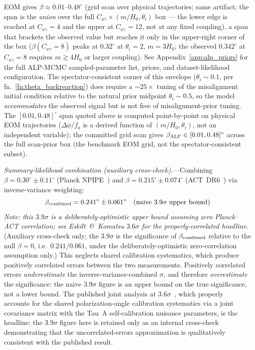 \documentclass[aps,prd,twocolumn,superscriptaddress,showpacs,preprintnumbers,nofootinbib,longbibliography,floatfix]{revtex4-2}
\newcommand{\sigmaunit}{\sigma}
\begin{document}
EOM gives $\beta\approx 0.01$--$0.48^\circ$ (grid scan over physical
trajectories; same artifact; the span is the \emph{union} over the full
$C_{a\gamma}\times(m/H_0,\theta_i)$ box --- the lower edge is reached at
$C_{a\gamma}=4$ and the upper at $C_{a\gamma}=12$, not at any fixed
coupling), a span that brackets the observed value but
reaches it only in the upper-right corner of the box ($\beta(C_{a\gamma}{=}8)$
peaks at $0.32^\circ$ at $\theta_i=2$, $m=3H_0$; the observed
$0.342^\circ$ at $C_{a\gamma}=8$ requires $m\gtrsim 4H_0$ or larger
coupling). See Appendix~\ref{app:alp_priors}
for the full ALP-MCMC sampled-parameter list, priors, and dataset-likelihood
configuration. The spectator-consistent corner of this envelope
($\theta_i\sim 0.1$, per fn.~\ref{fn:theta_backreaction}) does require a
$\sim 25\times$ tuning of the misalignment initial condition relative to the
natural prior midpoint $\theta_i\sim 0.5$, so the model
\textit{accommodates} the observed signal but is not free of misalignment-prior tuning.
The $[0.01,0.48]^\circ$ span quoted above is computed point-by-point on
physical EOM trajectories ($\Delta\phi/f_a$ is a derived function of
$(m/H_0, \theta_i)$, not an independent variable);
the committed grid scan gives $\beta_{\rm ALP}\in[0.01,0.48]^\circ$
across the full scan-prior box (the benchmark EOM grid, not the spectator-consistent subset).

\textit{Summary-likelihood combination (auxiliary cross-check).}---Combining
$\beta = 0.30^\circ\pm 0.11^\circ$ (Planck NPIPE~\cite{DiegoPalazuelos2022}) and
$\beta = 0.215^\circ\pm 0.074^\circ$ (ACT~DR6~\cite{DiegoPalazuelos2025}) via
inverse-variance weighting:
\begin{equation}
\beta_{\rm combined} = 0.241^\circ\pm 0.061^\circ \quad (\text{naive } 3.9\sigmaunit\text{ upper bound})
\label{eq:beta_combined}
\end{equation}
\emph{Note: this $3.9\sigmaunit$ is a deliberately-optimistic upper
bound assuming zero Planck--ACT correlation; see Eskilt~\&~Komatsu
$3.6\sigmaunit$ for the properly-correlated headline.}
(Auxiliary cross-check only; the $3.9\sigmaunit$ is the significance of
$\beta_{\rm combined}$ relative to the null $\beta=0$, i.e.\ $0.241/0.061$,
under the deliberately-optimistic zero-correlation assumption only.)
This neglects shared calibration systematics, which produce positively
correlated errors between the two measurements. Positively correlated errors
\emph{underestimate} the inverse-variance-combined $\sigma$, and therefore
\emph{overestimate} the significance: the naive $3.9\sigmaunit$ figure is an
upper bound on the true significance, not a lower bound. The published joint
analysis at $3.6\sigmaunit$~\cite{Eskilt2022}, which properly accounts for the
shared polarization-angle calibration systematics via a joint covariance
matrix with the Tau~A self-calibration nuisance parameters, is the headline;
the $3.9\sigmaunit$ figure here is retained only as an internal cross-check
demonstrating that the uncorrelated-errors approximation is qualitatively
consistent with the published result.
\end{document}
